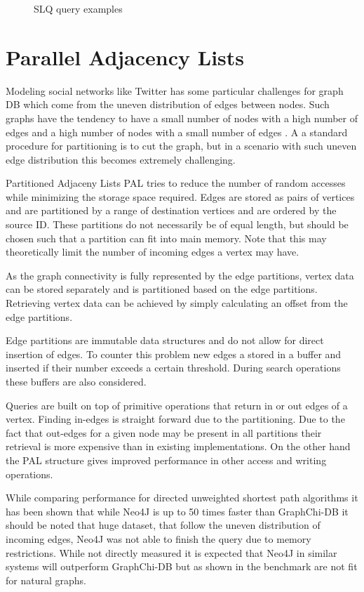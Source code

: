 \documentclass{sig-alternate}
\begin{document}
\begin{figure}
\centering
{}
\caption{SLQ query examples}
\label{fig:slqexample}
\end{figure}

\section{Parallel Adjacency Lists}
Modeling social networks like Twitter has some particular challenges
for graph DB which come from the uneven distribution of edges between nodes.
Such graphs have the tendency to have a small number of nodes with a high number of edges
and a high number of nodes with a small number of edges \cite{gonzalez2012powergraph}.
A a standard procedure for partitioning is to cut the graph, but in 
a scenario with such uneven edge distribution this becomes extremely challenging.

Partitioned Adjaceny Lists PAL \cite{kyrola2014graphchi} tries to reduce the number of random accesses while minimizing the storage
space required. Edges are stored as pairs of vertices and are partitioned by a range of destination
vertices and are ordered by the source ID. These partitions do not necessarily be of equal length, but should 
be chosen such that a partition can fit into main memory. Note that this may theoretically limit the number of
incoming edges a vertex may have.

As the graph connectivity is fully represented 
by the edge partitions, vertex data can be stored separately and is partitioned 
based on the edge partitions. Retrieving vertex data can be achieved by simply calculating an offset from
the edge partitions.

Edge partitions are immutable data structures and do not allow for direct insertion of edges. 
To counter this problem new edges a stored in a buffer and inserted if their number exceeds a certain threshold.
During search operations these buffers are also considered.

Queries are built on top of primitive operations that return in or out edges of a vertex.
Finding in-edges is straight forward due to the partitioning. Due to the fact that out-edges
for a given node may be present in all partitions their retrieval is more expensive than
in existing implementations. On the other hand the PAL structure gives improved performance in other access and writing operations.

While comparing performance for directed unweighted shortest path algorithms it has been shown that while Neo4J
is up to 50 times faster than GraphChi-DB it should be noted that huge dataset, that follow the uneven distribution 
of incoming edges, Neo4J was not able to finish the query due to memory restrictions.
While not directly measured it is expected that Neo4J in similar systems will outperform 
GraphChi-DB but as shown in the benchmark are not fit for natural graphs.
\end{document}
